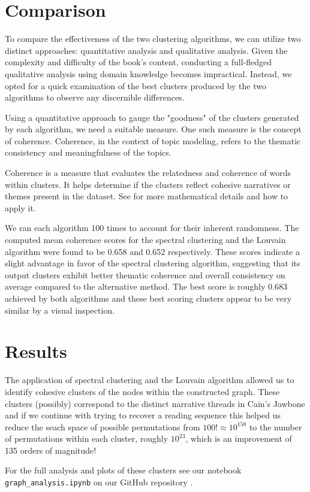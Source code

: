 \documentclass[a4paper]{article}
\begin{document}
\section{Comparison}

To compare the effectiveness of the two clustering algorithms, we can utilize two distinct approaches: quantitative analysis and qualitative analysis. Given the complexity and difficulty of the book's content, conducting a full-fledged qualitative analysis using domain knowledge becomes impractical. Instead, we opted for a quick examination of the best clusters produced by the two algorithms to observe any discernible differences.

Using a quantitative approach to gauge the "goodness" of the clusters generated by each algorithm, we need a suitable measure. One such measure is the concept of coherence. Coherence, in the context of topic modeling, refers to the thematic consistency and meaningfulness of the topics.

Coherence is a measure that evaluates the relatedness and coherence of words within clusters. It helps determine if the clusters reflect cohesive narratives or themes present in the dataset. See \cite{coherence} for more mathematical details and how to apply it.

We ran each algorithm 100 times to account for their inherent randomness. The computed mean coherence scores for the spectral clustering and the Louvain algorithm were found to be 0.658 and 0.652 respectively. These scores indicate a slight advantage in favor of the spectral clustering algorithm, suggesting that its output clusters exhibit better thematic coherence and overall consistency on average compared to the alternative method. The best score is roughly 0.683 achieved by both algorithms and these best scoring clusters appear to be very similar by a visual inspection.


\section{Results}

The application of spectral clustering and the Louvain algorithm allowed us to identify cohesive clusters of the nodes within the constructed graph. These clusters (possibly) correspond to the distinct narrative threads in Cain's Jawbone and if we continue with trying to recover a reading sequence this helped us reduce the seach space of possible permutations from $100! \approx 10^{158}$ to the number of permutations within each cluster, roughly $10^{23}$, which is an improvement of 135 orders of magnitude!

For the full analysis and plots of these clusters see our notebook \\ \verb|graph_analysis.ipynb| on our GitHub repository \cite{github}.


\printbibliography
\end{document}
